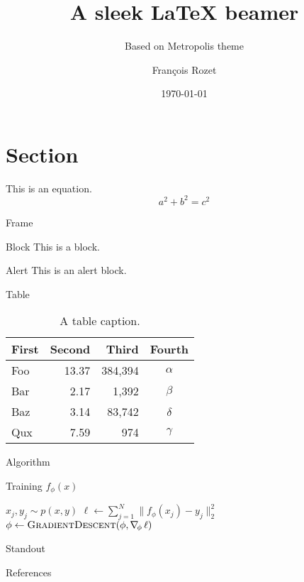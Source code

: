 \documentclass[12pt]{beamer}
\title{A sleek \LaTeX{} beamer}
\subtitle{Based on Metropolis theme}
\author{François Rozet}
\institute{University of Liège}
\date{\today}
\begin{document}
\maketitle

\section{Section}

\begin{frame}
    This is an equation. $$ a^2 + b^2 = c^2 $$
\end{frame}

\begin{frame}{Frame}
    \begin{block}{Block}
        This is a block.
    \end{block}

    \begin{alertblock}{Alert}
        This is an \alert{alert} block.
    \end{alertblock}

\end{frame}

\begin{frame}{Table}
    \begin{table}
        \centering
        \begin{tabular}{lrrc}
            \toprule
            \textbf{First} & \textbf{Second} & \textbf{Third} & \textbf{Fourth} \\
            \midrule
            Foo & 13.37 & 384,394 & $\alpha$ \\
            Bar & 2.17 & 1,392 & $\beta$ \\
            Baz & 3.14 & 83,742 & $\delta$ \\
            Qux & 7.59 & 974 & $\gamma$ \\
            \bottomrule
        \end{tabular}
        \caption{A table caption.}
    \end{table}
\end{frame}

\begin{frame}{Algorithm}
    \begin{algorithm}[H]
        \caption{Training $f_\phi(x)$} \label{alg:training}
        \begin{algorithmic}[1]
            \vspace{-0.5em}
                    \State $x_j, y_j \sim p(x, y)$
                \EndFor{}
                \State $\ell \gets \sum_{j=1}^N \| f_\phi(x_j) - y_j \|_2^2$
                \State $\phi \gets \Call{GradientDescent}{\phi, \nabla_{\!\phi} \, \ell}$
            \EndFor{}
	    \end{algorithmic}
    \end{algorithm}
\end{frame}

\begin{frame}[standout]
    Standout
\end{frame}

\begin{frame}[allowframebreaks]{References}
    \nocite{einstein}
    \nocite{knuthwebsite}
    \nocite{dirac}
    \printbibliography[heading=none]
\end{frame}
\end{document}
